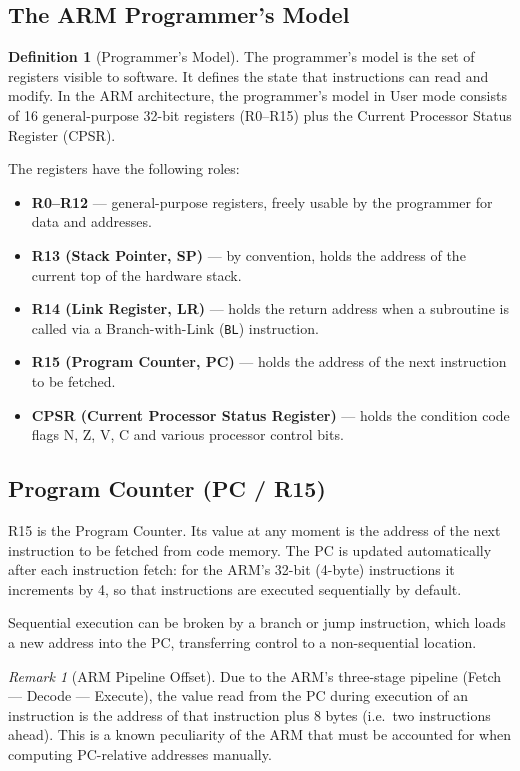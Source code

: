 \documentclass[11pt, a4paper, notitlepage]{report}
\theoremstyle{definition}
\newtheorem{definition}[theorem]{Definition}
\theoremstyle{remark}
\newtheorem{remark}[theorem]{Remark}
\theoremstyle{definition}
\begin{document}
\subsection{The ARM Programmer's Model}

\begin{definition}[Programmer's Model]
\label{def:programmer-model}
The programmer's model is the set of registers visible to software. It defines the state that instructions can read and modify. In the ARM architecture, the programmer's model in User mode consists of 16 general-purpose 32-bit registers (R0--R15) plus the Current Processor Status Register (CPSR).
\end{definition}

The registers have the following roles:

\begin{itemize}
  \item \textbf{R0--R12} --- general-purpose registers, freely usable by the programmer for data and addresses.
  \item \textbf{R13 (Stack Pointer, SP)} --- by convention, holds the address of the current top of the hardware stack.
  \item \textbf{R14 (Link Register, LR)} --- holds the return address when a subroutine is called via a Branch-with-Link (\texttt{BL}) instruction.
  \item \textbf{R15 (Program Counter, PC)} --- holds the address of the next instruction to be fetched.
  \item \textbf{CPSR (Current Processor Status Register)} --- holds the condition code flags N, Z, V, C and various processor control bits.
\end{itemize}

\subsection{Program Counter (PC / R15)}

R15 is the Program Counter. Its value at any moment is the address of the next instruction to be fetched from code memory. The PC is updated automatically after each instruction fetch: for the ARM's 32-bit (4-byte) instructions it increments by 4, so that instructions are executed sequentially by default.

Sequential execution can be broken by a branch or jump instruction, which loads a new address into the PC, transferring control to a non-sequential location.

\begin{remark}[ARM Pipeline Offset]
\label{rem:pipeline-offset}
Due to the ARM's three-stage pipeline (Fetch --- Decode --- Execute), the value read from the PC during execution of an instruction is the address of that instruction plus 8 bytes (i.e.\ two instructions ahead). This is a known peculiarity of the ARM that must be accounted for when computing PC-relative addresses manually.
\end{remark}
\end{document}
